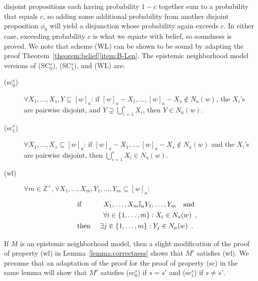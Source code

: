 \documentclass[12pt]{article}
\theoremstyle{definition}
\newcommand{\Int}{\mathbb{Z}}  %
\begin{document}
\begin{enumerate}
disjoint propositions each having probability $1-c$ together sum to a
probability that equals $c$, so adding some additional probability
from another disjoint proposition $\phi_0$ will yield a disjunction whose
probability again exceeds $c$.  In either case, exceeding probability
$c$ is what we equate with belief, so soundness is proved.  We note
that scheme (WL) can be shown to be sound by adapting the proof
Theorem~\ref{theorem:belief}\eqref{item:B-Len}.  The epistemic
neighborhood model versions of (SC$_0^s$), (SC$_1^s$), and (WL) are:
\begin{description}
\item[(sc$_0^s$)] $\forall X_1,\dots,X_s,Y\subseteq[w]_a$:
  if $[w]_a-X_1,\dots,[w]_a-X_s\notin N_a(w)$,
  the $X_i$'s are pairwise disjoint, and $Y\supsetneq\bigcup_{i=1}^sX_i$,
  then $Y\in N_a(w)$.

\item[(sc$_1^s$)] $\forall X_1,\dots,X_s\subseteq[w]_a$: if
  $[w]_a-X_1,\dots,[w]_a-X_s\notin N_a(w)$ and the $X_i$'s are
  pairwise disjoint, then $\bigcup_{i=1}^sX_i\in N_a(w)$.
 
\item[(wl)] $\forall m\in\Int^+,\forall
  X_1,\dots,X_m,Y_1,\dots,Y_m\subseteq[w]_a:$
  \[
  \renewcommand{\arraystretch}{1.3}
  \begin{array}{ll}
    \text{if }
    &
    \begin{array}[t]{l}
      X_1,\dots,X_m\mathbb{I}_aY_1,\dots,Y_m\quad\text{and}
      \\
      \forall i\in\{1,\dots,m\}:
      X_i\in N_a(w) \enspace\text{,}
    \end{array}
    \\
    \text{then }
    &
    \exists j\in\{1,\dots,m\}: Y_j\in N_a(w)\enspace\text{.}
  \end{array}
  \]
\end{description}
If $M$ is an epistemic neighborhood model, then a slight modification
of the proof of property (wl) in Lemma~\ref{lemma:correctness} shows
that $M^c$ satisfies (wl).  We presume that an adaptation of the proof
for the proof of property (sc) in the same lemma will show that $M^c$
satisfies (sc$_0^s$) if $s=s'$ and (sc$_1^s$) if $s\neq s'$.


\end{enumerate}
\end{document}
